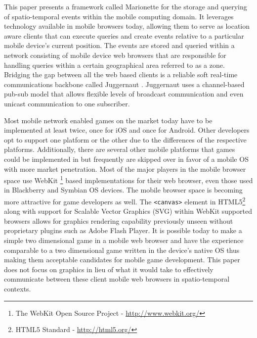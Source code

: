 \documentclass[12pt]{report}	%
\theoremstyle{definition}
\theoremstyle{remark}
\begin{document}
This paper presents a framework called Marionette for the storage and
querying of spatio-temporal events within the mobile computing domain.
It leverages technology available in mobile browsers today, allowing
them to serve as location aware clients that can execute queries and
create events relative to a particular mobile device's current position. The events are
stored and queried within a network consisting of mobile device web
browsers that are responsible for handling queries within a certain
geographical area referred to as a zone. Bridging the gap between all
the web based clients is a reliable soft real-time communications
backbone called Juggernaut \cite{juggernaut}. Juggernaut uses a channel-based pub-sub
model that allows flexible levels of broadcast communication and even
unicast communication to one subscriber.

Most mobile network enabled games on the market today have to be
implemented at least twice, once for iOS and once for Android. Other
developers opt to support one platform or the other due to the
differences of the respective platforms. Additionally, there are several
other mobile platforms that games could be implemented in but frequently are
skipped over in favor of a mobile OS with more market penetration. Most
of the major players in the mobile browser space use WebKit
\footnote{The WebKit Open Source Project - \url{http://www.webkit.org/}} based
implementations for their web browser, even those used in Blackberry and
Symbian OS devices. The mobile browser space is becoming more attractive
for game developers as well. The \texttt{<canvas>} element in 
HTML5\footnote{HTML5 Standard - \url{http://html5.org/}} along with
support for Scalable Vector Graphics (SVG) within WebKit supported
browsers allows for graphics rendering capability previously unseen without
proprietary plugins such as Adobe Flash Player. It is possible today to
make a simple two dimensional game in a mobile web browser and have the
experience comparable to a two dimensional game written in the device's native
OS thus making them acceptable candidates for mobile game development. 
This paper does not focus on graphics in lieu of what it would take to 
effectively communicate between these client mobile web browsers in 
spatio-temporal contexts.
\end{document}
